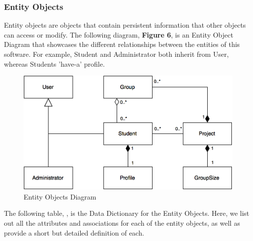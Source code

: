 \documentclass[12pt,letterpaper]{article}
\begin{document}
\subsubsection*{Entity Objects}

Entity objects are objects that contain persistent information that other objects can access or modify. The following diagram, {\bf Figure 6}, is an Entity Object Diagram
that showcases the different relationships between the entities of this software. For example, Student and Administrator both inherit from User, whereas Students 'have-a'
profile.

\begin{figure}[H]
	\centering{}
	\includegraphics[scale=0.35]{imgs/entity-object-diagram.png}
	\caption{Entity Objects Diagram}
\end{figure}

The following table, , is the Data Dictionary for the Entity Objects. Here, we list out all the attributes and associations for each of the entity objects, as well as provide
a short but detailed definition of each.
\end{document}
